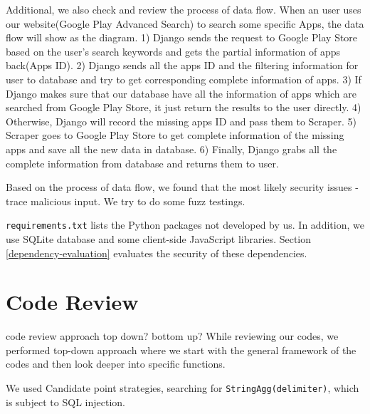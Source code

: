 \documentclass[12pt, a4paper]{article}
\newcommand{\code}[1]{\texttt{#1}}
\begin{document}
Additional, we also check and review the process of data flow. When an user uses our website(Google Play Advanced Search) to search some specific Apps, the data flow will show as the diagram. 1) Django sends the request to Google Play Store based on the user's search keywords and gets the partial information of apps back(Apps ID). 2) Django sends all the apps ID and the filtering information for user to database and try to get corresponding complete information of apps. 3) If Django makes sure that our database have all the information of apps which are searched from Google Play Store, it just return the results to the user directly. 4) Otherwise, Django will record the missing apps ID and pass them to Scraper. 5) Scraper goes to Google Play Store to get complete information of the missing apps and save all the new data in database. 6) Finally, Django grabs all the complete information from database and returns them to user.

Based on the process of data flow, we found that the most likely security issues - trace malicious input. We try to do some fuzz testings. 

\code{requirements.txt} lists the Python packages not developed by us. In addition, we use SQLite database and some client-side JavaScript libraries. Section \ref{dependency-evaluation} evaluates the security of these dependencies.


\section{Code Review}

code review approach
top down? bottom up?
While reviewing our codes, we performed top-down approach where we start with the general framework of the codes and then look deeper into specific functions.

We used Candidate point strategies, searching for \code{StringAgg(delimiter)}, which is subject to SQL injection.



\end{document}
